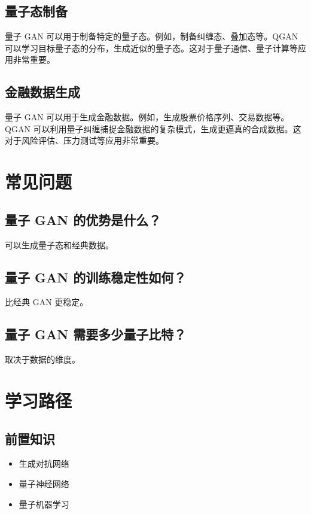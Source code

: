 \documentclass[12pt,a4paper]{article}
\begin{document}
\subsection{量子态制备}

量子 GAN 可以用于制备特定的量子态。例如，制备纠缠态、叠加态等。QGAN 可以学习目标量子态的分布，生成近似的量子态。这对于量子通信、量子计算等应用非常重要。

\subsection{金融数据生成}

量子 GAN 可以用于生成金融数据。例如，生成股票价格序列、交易数据等。QGAN 可以利用量子纠缠捕捉金融数据的复杂模式，生成更逼真的合成数据。这对于风险评估、压力测试等应用非常重要。

\section{常见问题}

\subsection{量子 GAN 的优势是什么？}

可以生成量子态和经典数据。

\subsection{量子 GAN 的训练稳定性如何？}

比经典 GAN 更稳定。

\subsection{量子 GAN 需要多少量子比特？}

取决于数据的维度。

\section{学习路径}

\subsection{前置知识}
\begin{itemize}
  \item 生成对抗网络
  \item 量子神经网络
  \item 量子机器学习
\end{itemize}
\end{document}
